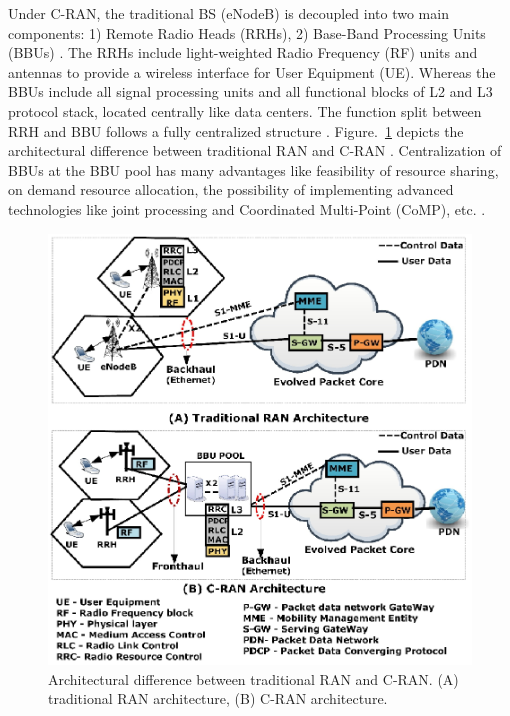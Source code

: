 \begin{multicols}{2}
Under C-RAN, the traditional BS (eNodeB) is decoupled into two main components: 1) Remote Radio Heads (RRHs), 2) Base-Band Processing Units (BBUs) \cite{art3-key05}. The RRHs include light-weighted Radio Frequency (RF) units and antennas to provide a wireless interface for User Equipment (UE). Whereas the BBUs include all signal processing units and all functional blocks of L2 and L3 protocol stack, located centrally like data centers. The function split between RRH
and BBU follows a fully centralized structure \cite{art3-key06}. Figure.~\ref{fig01} depicts the architectural difference between traditional RAN and C-RAN \cite{art3-key07}. Centralization of BBUs at the BBU pool has many advantages like feasibility of resource sharing, on demand resource allocation, the possibility of implementing advanced technologies like joint processing and Coordinated Multi-Point (CoMP), etc. \cite{art3-key08}.

\begin{figure}[H]
\centering
\includegraphics[scale=1.15]{src/Figures/chap3/fig01.jpg}
\caption{Architectural difference between traditional RAN and C-RAN. (A) traditional RAN architecture, (B) C-RAN architecture.}\label{fig01}
\vspace{-.5cm}
\end{figure}


\end{multicols}
